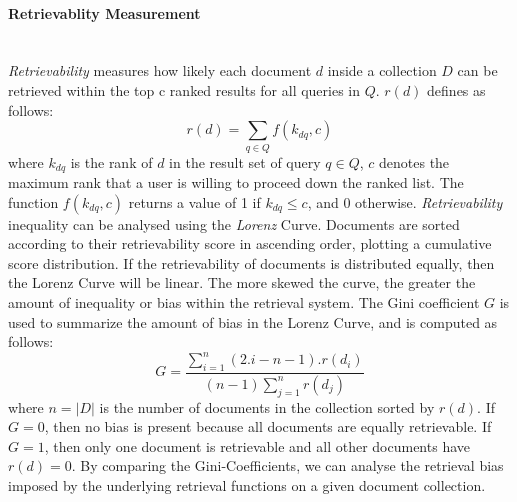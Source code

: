 \paragraph{Retrievablity Measurement}
\ \\
\textit{Retrievability} measures how likely each document $ d $ inside a collection $ D $ can be retrieved within the top c ranked results for all queries in $ Q $. $ r(d) $ defines as follows:
\[
r(d)=\sum_{q \in Q}f(k_{dq},c)
\]
where $ k_{dq} $ is the rank of $ d $ in the result set of query $ q \in Q $, $ c $ denotes the maximum rank that a user is willing to proceed down the ranked list. The function $ f(k_{dq},c) $ returns a value of 1 if $ k_{dq} \leq c $, and 0 otherwise. \textit{Retrievability} inequality can be analysed using the \textit{Lorenz} Curve. Documents are sorted according to their retrievability score in ascending order, plotting a cumulative score distribution. If the retrievability of documents is distributed equally, then the Lorenz Curve will be linear. The more skewed the curve, the greater the amount of inequality or bias within the retrieval system. The Gini coefficient $ G $ is used to summarize the amount of bias in the Lorenz Curve, and is computed as follows:
\begin{equation}
G=\frac{\sum_{i=1}^n(2.i-n-1).r(d_{i})}{(n-1)\sum_{j=1}^nr(d_{j})}
\end{equation}
\noindent
where $ n=|D| $ is the number of documents in the collection sorted by $ r(d) $. If $ G=0 $, then no bias is present because all documents are equally retrievable. If $ G=1 $, then only one document is retrievable and all other documents have $ r(d)=0 $. By comparing the Gini-Coefficients, we can analyse the retrieval bias imposed by the underlying retrieval functions on a given document collection.
